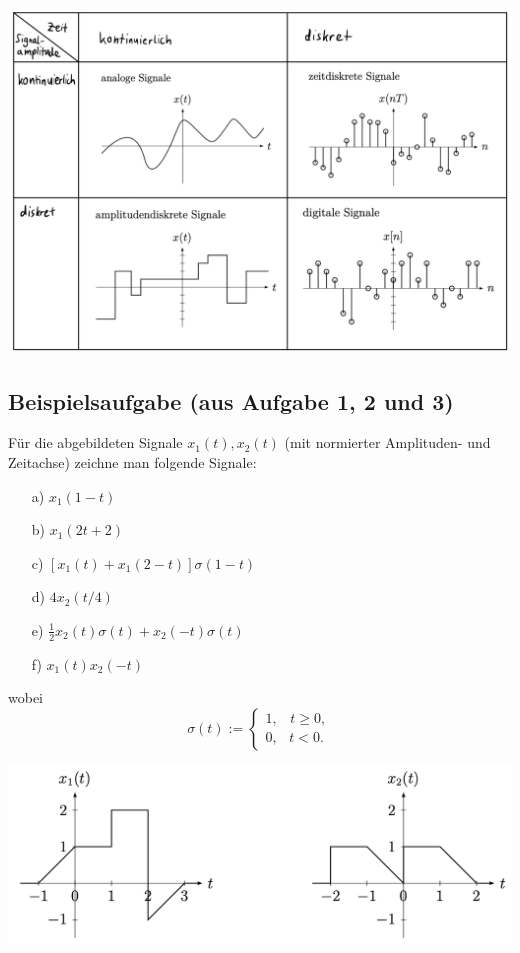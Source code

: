 \documentclass[11pt]{article}
\begin{document}
\begin{center}
    \includegraphics[width=0.78\linewidth]{docimgs/Signale.jpg}
\end{center}

\vspace*{-1cm}
\subsection*{Beispielsaufgabe \textnormal{(aus Aufgabe 1, 2 und 3)}}
\vspace*{-0.5cm}
Für die abgebildeten Signale $x_1(t), x_2(t)$ (mit normierter Amplituden- und Zeitachse) zeichne man folgende Signale:

\begin{multicols}{2}
\begin{itemize}
    \item[a)] $x_1(1-t)$ 
    \item[b)] $x_1(2t+2)$
    \item[c)] $\left[x_1(t) + x_1(2-t) \right]\sigma(1-t)$
    \item[d)] $4x_2(t/4)$
    \item[e)] $\frac{1}{2}x_2(t)\sigma(t) + x_2(-t)\sigma(t)$
    \item[f)] $x_1(t)x_2(-t)$
\end{itemize}

\end{multicols}
\vspace*{-0.5cm}
wobei
$$\sigma(t) := \begin{cases}
    1, \hspace{10pt} t\geq 0, \\
    0, \hspace{9pt} t < 0.
\end{cases} $$

\vspace{-0.75cm}
\begin{center}
    \includegraphics[width=0.8\linewidth]{docimgs/bsp_ex_signale.png}
\end{center}
\end{document}
